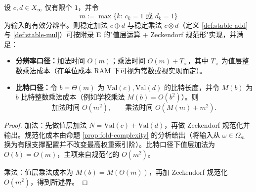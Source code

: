 \begin{proposition}[稳定加法与稳定乘法的复杂度]\label{prop:stable-arith-complexity}
设 $c,d\in X_\infty$ 仅有限个 $1$，并令
\[
m:=\max\{k:\ c_k=1\text{ 或 } d_k=1\}
\]
为输入的有效分辨率。则稳定加法 $c\oplus d$ 与稳定乘法 $c\otimes d$（定义 \ref{def:stable-add} 与 \ref{def:stable-mul}）可按附录 E 的"值层运算 + Zeckendorf 规范形"实现，并满足：
\begin{itemize}
  \item \textbf{分辨率口径：}加法时间 $O(m)$；乘法时间 $O(m)+T_\times$，其中 $T_\times$ 为值层整数乘法成本（在单位成本 RAM 下可视为常数或视实现而定）。
  \item \textbf{比特口径：}令 $b=\Theta(m)$ 为 $\mathrm{Val}(c),\mathrm{Val}(d)$ 的比特长度，并令 $M(b)$ 为 $b$ 比特整数乘法成本（例如学校乘法 $M(b)=O(b^2)$）。则
  \[
  \text{加法时间 }O(m^2),\qquad
  \text{乘法时间 }O(M(m)+m^2).
  \]
\end{itemize}
\end{proposition}

\begin{proof}
加法：先做值层加法 $N=\mathrm{Val}(c)+\mathrm{Val}(d)$，再做 Zeckendorf 规范化并输出。规范化成本由命题 \ref{prop:fold-complexity} 的分析给出（将输入从 $\omega\in\Omega_m$ 换为有限支撑配置并不改变最高权重索引阶）。比特口径下值层加法为 $O(b)=O(m)$，主项来自规范化的 $O(m^2)$。

乘法：值层乘法成本为 $M(b)=M(\Theta(m))$，再加 Zeckendorf 规范化 $O(m^2)$，得到所述界。
\end{proof}
